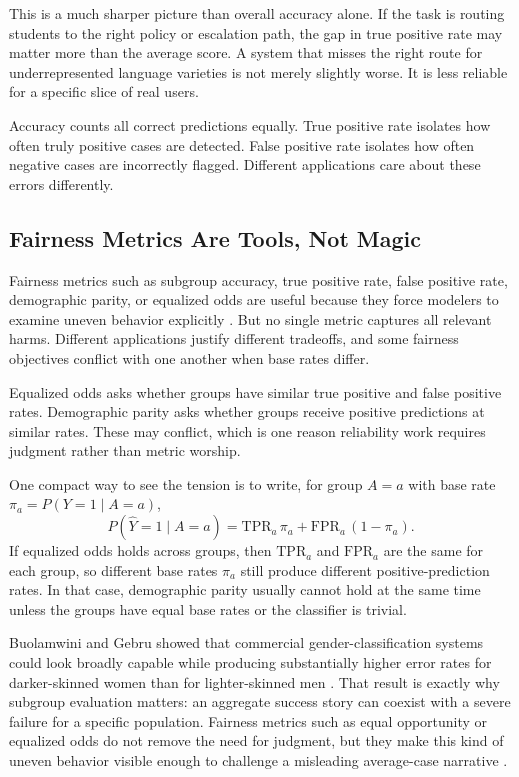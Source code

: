 This is a much sharper picture than overall accuracy alone. If the task is routing students to the right policy or escalation path, the gap in true positive rate may matter more than the average score. A system that misses the right route for underrepresented language varieties is not merely slightly worse. It is less reliable for a specific slice of real users.

\begin{prereqbridge}
Accuracy counts all correct predictions equally. True positive rate isolates how often truly positive cases are detected. False positive rate isolates how often negative cases are incorrectly flagged. Different applications care about these errors differently.
\end{prereqbridge}

\subsection{Fairness Metrics Are Tools, Not Magic}

Fairness metrics such as subgroup accuracy, true positive rate, false positive rate, demographic parity, or equalized odds are useful because they force modelers to examine uneven behavior explicitly \citep{hardt2016}. But no single metric captures all relevant harms. Different applications justify different tradeoffs, and some fairness objectives conflict with one another when base rates differ.

\begin{advancednote}
Equalized odds asks whether groups have similar true positive and false positive rates. Demographic parity asks whether groups receive positive predictions at similar rates. These may conflict, which is one reason reliability work requires judgment rather than metric worship.

One compact way to see the tension is to write, for group $A=a$ with base rate $\pi_a=P(Y=1\mid A=a)$,
\[
P(\hat Y=1\mid A=a)=\mathrm{TPR}_a\,\pi_a+\mathrm{FPR}_a\,(1-\pi_a).
\]
If equalized odds holds across groups, then $\mathrm{TPR}_a$ and $\mathrm{FPR}_a$ are the same for each group, so different base rates $\pi_a$ still produce different positive-prediction rates. In that case, demographic parity usually cannot hold at the same time unless the groups have equal base rates or the classifier is trivial.
\end{advancednote}

\begin{example}
Buolamwini and Gebru showed that commercial gender-classification systems could look broadly capable while producing substantially higher error rates for darker-skinned women than for lighter-skinned men \citep{buolamwini2018}. That result is exactly why subgroup evaluation matters: an aggregate success story can coexist with a severe failure for a specific population. Fairness metrics such as equal opportunity or equalized odds do not remove the need for judgment, but they make this kind of uneven behavior visible enough to challenge a misleading average-case narrative \citep{hardt2016}.
\end{example}

